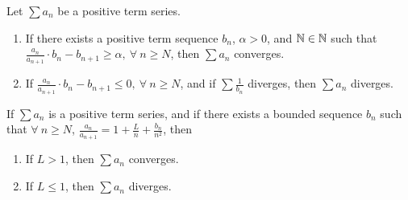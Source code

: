 \begin{theorem}
	Let $\sum a_n$ be a positive term series.
	\begin{enumerate}
		\item If there exists a positive term sequence $b_n$, $\alpha > 0$, and $\mathbb{N} \in \mathbb{N}$ such that $\displaystyle\frac{a_n}{a_{n+1}} \cdot b_n - b_{n+1} \geq \alpha,\ \forall\ n \geq N$, then $\sum a_n$ converges.
		\item If $\displaystyle\frac{a_n}{a_{n+1}}\cdot b_n - b_{n+1} \leq 0,\ \forall\ n \geq N$, and if $\sum \frac{1}{b_n}$ diverges, then $\sum a_n$ diverges.
	\end{enumerate}
\end{theorem}

\begin{theorem}
	If $\sum a_n$ is a positive term series, and if there exists a bounded sequence $b_n$ such that $\forall\ n \geq N$, $\displaystyle\frac{a_n}{a_{n+1}} = 1 +\frac{L}{n} + \frac{b_n}{n^2}$, then
	\begin{enumerate}
		\item If $L > 1$, then $\sum a_n$ converges.
		\item If $L \leq 1$, then $\sum a_n$ diverges.
	\end{enumerate}
\end{theorem}
